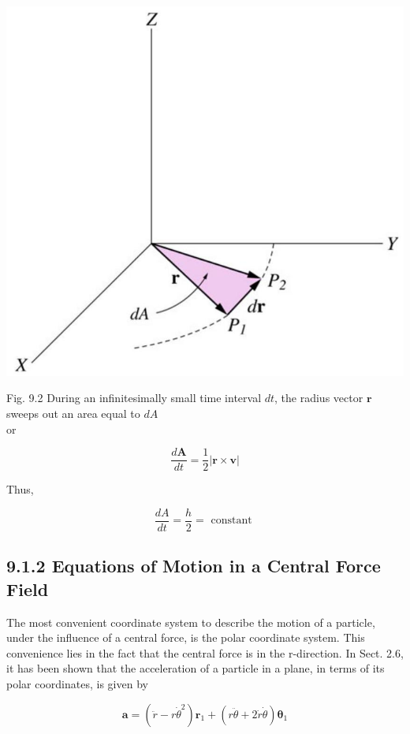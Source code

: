 \documentclass[10pt]{article}
\begin{document}
\begin{center}
\includegraphics[max width=\textwidth]{2024_09_13_db1f357d2aad0a03eb2eg-143(1)}
\end{center}

Fig. 9.2 During an infinitesimally small time interval $d t$, the radius vector $\mathbf{r}$ sweeps out an area equal to $d A$\\
or

$$
\frac{d \mathbf{A}}{d t}=\frac{1}{2}|\mathbf{r} \times \mathbf{v}|
$$

Thus,

$$
\frac{d A}{d t}=\frac{h}{2}=\text { constant }
$$

\subsection*{9.1.2 Equations of Motion in a Central Force Field}
The most convenient coordinate system to describe the motion of a particle, under the influence of a central force, is the polar coordinate system. This convenience lies in the fact that the central force is in the r-direction. In Sect. 2.6, it has been shown that the acceleration of a particle in a plane, in terms of its polar coordinates, is given by

$$
\mathbf{a}=\left(\ddot{r}-r \dot{\theta}^{2}\right) \mathbf{r}_{1}+(r \ddot{\theta}+2 \dot{r} \dot{\theta}) \boldsymbol{\theta}_{1}
$$
\end{document}
